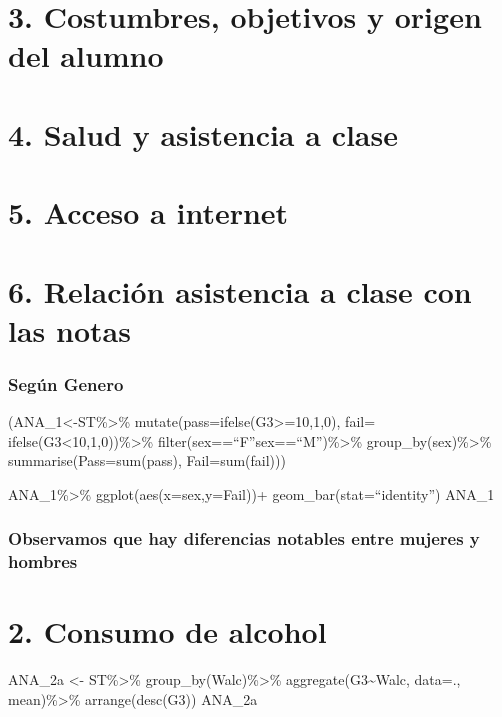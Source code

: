 \documentclass[]{article}
\begin{document}
\section{3. Costumbres, objetivos y origen del
alumno}\label{costumbres-objetivos-y-origen-del-alumno}

\section{4. Salud y asistencia a
clase}\label{salud-y-asistencia-a-clase}

\section{5. Acceso a internet}\label{acceso-a-internet}

\section{6. Relación asistencia a clase con las
notas}\label{relacion-asistencia-a-clase-con-las-notas}

\subsubsection{Según Genero}\label{segun-genero}

(ANA\_1\textless{}-ST\%\textgreater{}\%
mutate(pass=ifelse(G3\textgreater{}=10,1,0), fail=
ifelse(G3\textless{}10,1,0))\%\textgreater{}\%
filter(sex==``F''\textbar{}sex==``M'')\%\textgreater{}\%
group\_by(sex)\%\textgreater{}\% summarise(Pass=sum(pass),
Fail=sum(fail)))

ANA\_1\%\textgreater{}\% ggplot(aes(x=sex,y=Fail))+
geom\_bar(stat=``identity'') ANA\_1

\subsubsection{Observamos que hay diferencias notables entre mujeres y
hombres}\label{observamos-que-hay-diferencias-notables-entre-mujeres-y-hombres}

\section{2. Consumo de alcohol}\label{consumo-de-alcohol}

ANA\_2a \textless{}- ST\%\textgreater{}\%
group\_by(Walc)\%\textgreater{}\% aggregate(G3\textasciitilde{}Walc,
data=., mean)\%\textgreater{}\% arrange(desc(G3)) ANA\_2a
\end{document}
